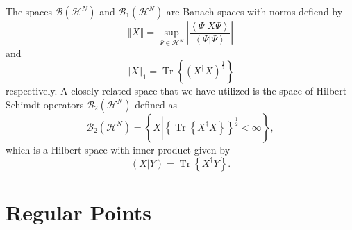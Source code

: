 \documentclass[aps,preprint]{revtex4}%
\begin{document}
The spaces $\mathcal{B}\left(  \mathcal{H}^{N}\right)  $ and $\mathcal{B}%
_{1}\left(  \mathcal{H}^{N}\right)  $ are Banach spaces with norms defiend by
\begin{equation}
\left\Vert X\right\Vert =\sup_{\Psi\in\mathcal{H}^{N}}\left\vert
\frac{\left\langle \Psi\left\vert X\Psi\right.  \right\rangle }{\left\langle
\Psi\left\vert \Psi\right.  \right\rangle }\right\vert
\end{equation}
and
\begin{equation}
\left\Vert X\right\Vert _{1}=\operatorname{Tr}\left\{  \left(  X^{\dagger
}X\right)  ^{\frac{1}{2}}\right\}
\end{equation}
respectively. A closely related space that we have utilized is the space of
Hilbert Schimdt operators $\mathcal{B}_{2}\left(  \mathcal{H}^{N}\right)  $
defined as
\begin{equation}
\mathcal{B}_{2}\left(  \mathcal{H}^{N}\right)  =\left\{  X\left\vert \left\{
\operatorname{Tr}\left\{  X^{\dagger}X\right\}  \right\}  ^{\frac{1}{2}%
}<\infty\right.  \right\}  ,
\end{equation}
which is a Hilbert space with inner product given by
\begin{equation}
\left(  X\left\vert Y\right.  \right)  =\operatorname{Tr}\left\{  X^{\dagger
}Y\right\}  .
\end{equation}


\section{Regular Points \label{Regular}}
\end{document}
